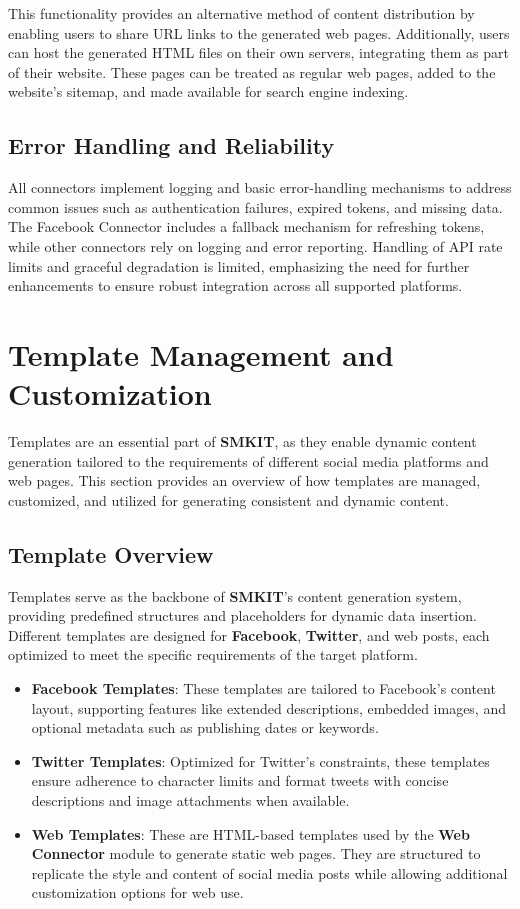 This functionality provides an alternative method of content distribution by enabling users to share URL links to the generated web pages. Additionally, users can host the generated HTML files on their own servers, integrating them as part of their website. These pages can be treated as regular web pages, added to the website's sitemap, and made available for search engine indexing.

\subsection{Error Handling and Reliability}
\label{subsec:error_handling_reliability}
All connectors implement logging \cite{logging_module_documentation} and basic error-handling mechanisms to address common issues such as authentication failures, expired tokens, and missing data. The Facebook Connector includes a fallback mechanism for refreshing tokens, while other connectors rely on logging and error reporting. Handling of API rate limits and graceful degradation is limited, emphasizing the need for further enhancements to ensure robust integration across all supported platforms.


\section{Template Management and Customization}
\label{sec:template_management_and_customization}
Templates are an essential part of \textbf{SMKIT}, as they enable dynamic content generation tailored to the requirements of different social media platforms and web pages. This section provides an overview of how templates are managed, customized, and utilized for generating consistent and dynamic content.

\subsection{Template Overview}
\label{subsec:template_overview}
Templates serve as the backbone of \textbf{SMKIT}'s content generation system, providing predefined structures and placeholders for dynamic data insertion. Different templates are designed for \textbf{Facebook}, \textbf{Twitter}, and web posts, each optimized to meet the specific requirements of the target platform.

\begin{itemize}
    \item \textbf{Facebook Templates}: These templates are tailored to Facebook's content layout, supporting features like extended descriptions, embedded images, and optional metadata such as publishing dates or keywords.
    \item \textbf{Twitter Templates}: Optimized for Twitter’s constraints, these templates ensure adherence to character limits and format tweets with concise descriptions and image attachments when available.
    \item \textbf{Web Templates}: These are HTML-based templates used by the \textbf{Web Connector} module to generate static web pages. They are structured to replicate the style and content of social media posts while allowing additional customization options for web use.
\end{itemize}

